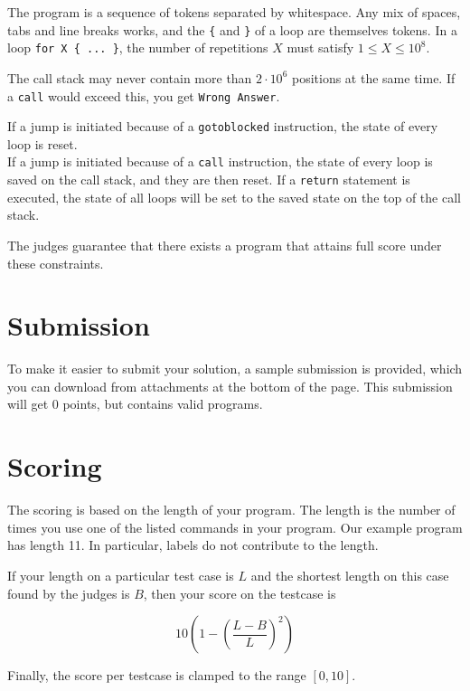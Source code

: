 The program is a sequence of tokens separated by whitespace.
Any mix of spaces, tabs and line breaks works, and the \texttt{\{} and \texttt{\}} of a loop are themselves tokens.
In a loop \texttt{for X \{ ... \}}, the number of repetitions $X$ must satisfy $1 \leq X \leq 10^8$.

The call stack may never contain more than $2 \cdot 10^6$ positions at the same time.
If a \texttt{call} would exceed this, you get \texttt{Wrong Answer}.

If a jump is initiated because of a \texttt{gotoblocked} instruction, the state of every loop is reset. \\
If a jump is initiated because of a \texttt{call} instruction, the state of every loop is saved on the call stack, and they are then reset.
If a \texttt{return} statement is executed, the state of all loops will be set to the saved state on the top of the call stack.

The judges guarantee that there exists a program that attains full score under these constraints.

\section*{Submission}
To make it easier to submit your solution, a sample submission is provided, which you can download from attachments at the bottom of the page.
This submission will get 0 points, but contains valid programs.

\section*{Scoring}
The scoring is based on the length of your program. The length is the number of times you use one
of the listed commands in your program. Our example program has length 11. In particular, labels
do not contribute to the length.

If your length on a particular test case is $L$ and the shortest length on this case found by the
judges is $B$, then your score on the testcase is

\[ 10 (1 - (\frac{L - B}{L})^2)\]

Finally, the score per testcase is clamped to the range $[0,10]$.

